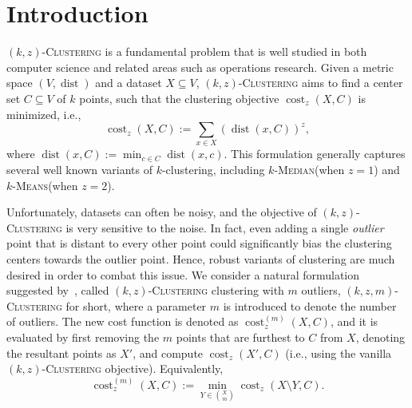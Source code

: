 \documentclass[letterpaper,11pt]{article}
\theoremstyle{plain}
\theoremstyle{definition}
\theoremstyle{remark}
\DeclareMathOperator{\cost}{cost}
\DeclareMathOperator{\dist}{dist}
\newcommand{\ProblemName}[1]{\textsc{#1}}
\newcommand{\kMedian}{\ProblemName{$k$-Median}\xspace}
\newcommand{\kMeans}{\ProblemName{$k$-Means}\xspace}
\newcommand{\kzC}{\ProblemName{$(k,z)$-Clustering}\xspace}
\newcommand{\kzmC}{\ProblemName{$(k,z,m)$-Clustering}\xspace}
\begin{document}
 



\section{Introduction}

\kzC is a fundamental problem that is well studied in both computer science and related areas such as operations research.
Given a metric space $(V, \dist)$ and a dataset $X \subseteq V$,
\kzC aims to find a center set $C \subseteq V$ of $k$ points, such that the clustering objective $\cost_z(X, C)$ is minimized, i.e.,
\[
    \cost_z(X, C) := \sum_{x \in X} (\dist(x, C))^z,
\]
where $\dist(x, C) := \min_{c \in C} \dist(x, c)$.
This formulation generally captures several well known variants of $k$-clustering,
including \kMedian (when $z = 1$) and \kMeans (when $z = 2$).

Unfortunately, datasets can often be noisy, and the objective of \kzC is very sensitive to the noise.
In fact, even adding a single \emph{outlier} point that is distant to every other point could significantly bias the clustering centers towards the outlier point. 
Hence, robust variants of clustering are much desired in order to combat this issue.
We consider a natural formulation suggested by~\cite{DBLP:conf/soda/CharikarKMN01},
called \kzC clustering with $m$ outliers, \kzmC for short,
where a parameter $m$ is introduced to denote the number of outliers.
The new cost function is denoted as $\cost_z^{(m)}(X, C)$, and it is evaluated
by first removing the $m$ points that are furthest to $C$ from $X$,
denoting the resultant points as $X'$, and compute $\cost_z(X', C)$ (i.e., using the vanilla \kzC objective).
Equivalently, 
\[
    \cost_z^{(m)}(X,C) := \min_{Y \in \binom{X}{m}} \cost_z(X \setminus Y,C).
\]
\end{document}
